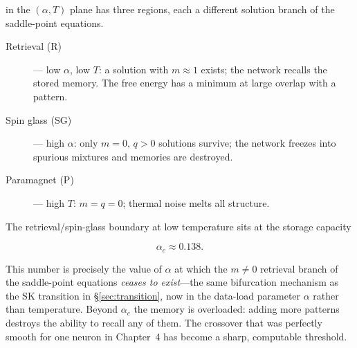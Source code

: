 \documentclass[nobib,justified]{tufte-handout}
\begin{document}
 in the $(\alpha,T)$ plane has three regions,
each a different solution branch of the saddle-point equations.
\begin{description}
\item[Retrieval (R)] --- low $\alpha$, low $T$: a solution with $m\approx1$
  exists; the network recalls the stored memory. The free energy has a
  minimum at large overlap with a pattern.
\item[Spin glass (SG)] --- high $\alpha$: only $m=0,\,q>0$ solutions
  survive; the network freezes into spurious mixtures and memories are
  destroyed.
\item[Paramagnet (P)] --- high $T$: $m=q=0$; thermal noise melts all
  structure.
\end{description}

 The retrieval/spin-glass boundary at
low temperature sits at the storage capacity
\begin{keyresult}
\[
  \alpha_c \approx 0.138 .
\]
\end{keyresult}
\noindent
This number is precisely the value of $\alpha$ at which the $m\neq0$
retrieval branch of the saddle-point equations \emph{ceases to exist}---the
same bifurcation mechanism as the SK transition in \S\ref{sec:transition},
now in the data-load parameter $\alpha$ rather than temperature. Beyond
$\alpha_c$ the memory is overloaded: adding more patterns destroys the
ability to recall any of them. The crossover that was perfectly smooth for
one neuron in Chapter~4 has become a sharp, computable threshold.
\end{document}
